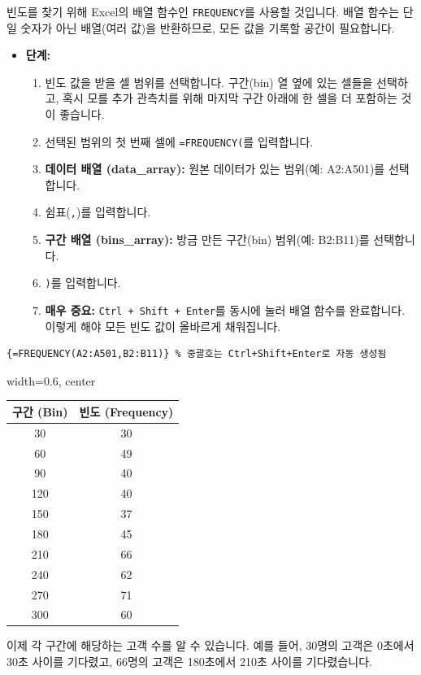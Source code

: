 \documentclass[11pt,a4paper]{article}
\theoremstyle{definition}
\begin{document}
\begin{tcolorbox}[title={빈도 계산 (Calculating Frequency)}]
빈도를 찾기 위해 Excel의 배열 함수인 \texttt{FREQUENCY}를 사용할 것입니다. 배열 함수는 단일 숫자가 아닌 배열(여러 값)을 반환하므로, 모든 값을 기록할 공간이 필요합니다.

\begin{itemize}
    \item \textbf{단계:}
    \begin{enumerate}
        \item 빈도 값을 받을 셀 범위를 선택합니다. 구간(bin) 열 옆에 있는 셀들을 선택하고, 혹시 모를 추가 관측치를 위해 마지막 구간 아래에 한 셀을 더 포함하는 것이 좋습니다.
        \item 선택된 범위의 첫 번째 셀에 \texttt{=FREQUENCY(}를 입력합니다.
        \item \textbf{데이터 배열 (data\_array):} 원본 데이터가 있는 범위(예: A2:A501)를 선택합니다.
        \item 쉼표(\texttt{,})를 입력합니다.
        \item \textbf{구간 배열 (bins\_array):} 방금 만든 구간(bin) 범위(예: B2:B11)를 선택합니다.
        \item \texttt{)}를 입력합니다.
        \item \textbf{매우 중요:} \texttt{Ctrl + Shift + Enter}를 동시에 눌러 배열 함수를 완료합니다. 이렇게 해야 모든 빈도 값이 올바르게 채워집니다.
    \end{enumerate}
\end{itemize}

\begin{lstlisting}[caption={Excel FREQUENCY 함수 사용 예시}, label={lst:excel_frequency}]
{=FREQUENCY(A2:A501,B2:B11)} % 중괄호는 Ctrl+Shift+Enter로 자동 생성됨
\end{lstlisting}

\begin{center}
\label{tab:excel_frequency_results}
\begin{adjustbox}{width=0.6\textwidth, center}
\begin{tabular}{cc}
\toprule
\textbf{구간 (Bin)} & \textbf{빈도 (Frequency)} \\
\midrule
30 & 30 \\
60 & 49 \\
90 & 40 \\
120 & 40 \\
150 & 37 \\
180 & 45 \\
210 & 66 \\
240 & 62 \\
270 & 71 \\
300 & 60 \\
\bottomrule
\end{tabular}
\end{adjustbox}
\end{center}
이제 각 구간에 해당하는 고객 수를 알 수 있습니다. 예를 들어, 30명의 고객은 0초에서 30초 사이를 기다렸고, 66명의 고객은 180초에서 210초 사이를 기다렸습니다.
\end{tcolorbox}
\end{document}
